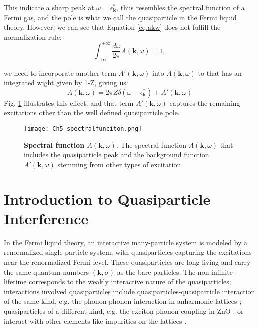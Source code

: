 This indicate a sharp peak at $\omega=\epsilon^*_\textbf{k}$, thus resembles the spectral function of a Fermi gas, and the pole is what we call the quasiparticle in the Fermi liquid theory. However, we can see that Equation \ref{eq.akw} does not fulfill the normalization rule: 
\begin{equation}
	\int_{-\infty}^{+\infty} \frac{d\omega}{2\pi} A(\textbf{k},\omega) = 1, 
\end{equation}

we need to incorporate another term $A'(\textbf{k},\omega)$ into $ A(\textbf{k},\omega)$ to that has an integrated wight given by 1-Z, giving us: 
\begin{equation}
	\label{eq.akw}
	A(\textbf{k},\omega) = 2\pi Z\delta(\omega-\epsilon^*_\textbf{k}) + A'(\textbf{k},\omega)
\end{equation}
Fig. \ref{fig:ch5_spect} \cite{bruusManyBodyQuantum2004} illustrates this effect, and that term $A'(\textbf{k},\omega)$ captures the remaining excitations other than the well defined quasiparticle pole. 

\begin{figure}
	\centering
	\texttt{[image: Ch5\_spectralfunciton.png]}
	\caption[\textbf{Spectral function $A(\textbf{k},\omega)$}]{\textbf{Spectral function $A(\textbf{k},\omega)$}. The spectral function $A(\textbf{k},\omega)$ that includes the quasiparticle peak and the background function $A'(\textbf{k},\omega)$ stemming from other types of excitation}
	\label{fig:ch5_spect}
\end{figure}

\section{Introduction to Quasiparticle Interference}

In the Fermi liquid theory, an interactive many-particle system is modeled by a renormalized single-particle system, with quasiparticles capturing the excitations near the renormalized Fermi level. These quasiparticles are long-living and carry the same quantum numbers $(\textbf{k}, \sigma)$ as the bare particles. The non-infinite lifetime corresponds to the weakly interactive nature of the quasiparticles; interactions involved quasiparticles include quasiparticles-quasiparticle interaction of the same kind, e.g. the phonon-phonon interaction in anharmonic lattices \cite{kimExploringAnharmonicLattice2023}; quasiparticles of a different kind, e.g. the exciton-phonon coupling in ZnO \cite{mendelsbergPhotoluminescenceExcitonphononCoupling2011}; or interact with other elements like impurities on the lattices \cite{avrahamQuasiparticleInterferenceStudies2018}. 

